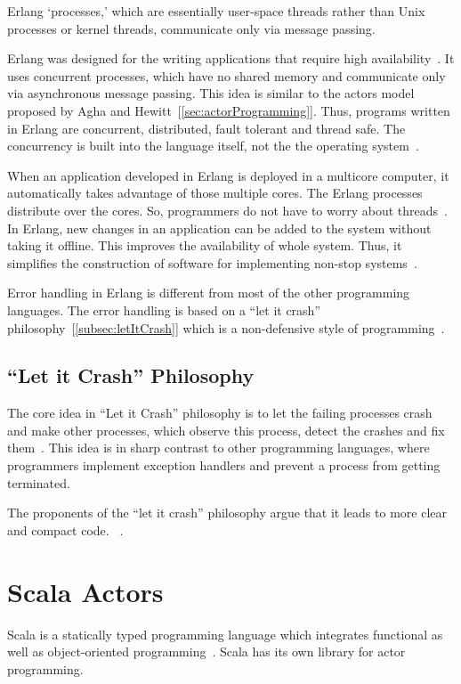   Erlang ‘processes,’ which are essentially user-space threads rather than Unix processes or kernel threads, communicate only via message passing.

  Erlang was designed for the writing applications that require high availability~\cite{armstrong}. It uses concurrent processes, which have no shared memory and communicate only via asynchronous message passing. This idea is similar to the actors model proposed by Agha and Hewitt~[\autoref{sec:actorProgramming}]. Thus, programs written in Erlang are concurrent, distributed, fault tolerant and thread safe. The concurrency is built into the language itself, not the the operating system~\cite{Armstrong:2010:ERL:1810891.1810910}.

  When an application developed in Erlang is deployed in a multicore computer, it automatically takes advantage of those multiple cores. The Erlang processes distribute over the cores. So, programmers do not have to worry about threads~\cite{Armstrong:2010:ERL:1810891.1810910}. In Erlang, new changes in an application can be added to the system without taking it offline. This improves the availability of whole system. Thus, it simplifies the construction of software for implementing non-stop systems~\cite{armstrong}.

  Error handling in Erlang is different from most of the other programming languages. The error handling is based on a “let it crash” philosophy~[\autoref{subsec:letItCrash}] which is a non-defensive style of programming~\cite{armstrong, Armstrong:2010:ERL:1810891.1810910}.

\subsection{“Let it Crash” Philosophy}
\label{subsec:letItCrash}
  The core idea in “Let it Crash” philosophy is to let the failing processes crash and make other processes, which observe this process, detect the crashes and fix them~\cite{Armstrong:2010:ERL:1810891.1810910}. This idea is in sharp contrast to other programming languages, where programmers implement exception handlers and prevent a process from getting terminated.

  The proponents of the “let it crash” philosophy argue that it leads to more clear and compact code.
~\cite{Armstrong:2010:ERL:1810891.1810910}.

\section{Scala Actors}
Scala is a statically typed programming language which integrates functional as well as object-oriented programming~\cite{Odersky}. Scala has its own library for actor programming.

